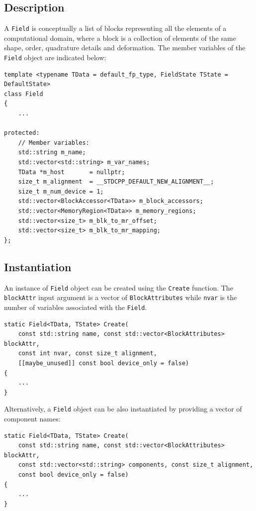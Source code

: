 \subsection{Description}
A \lstinline[style=C++Style]!Field! is conceptually a list of blocks
representing all the elements of a computational domain, where a block
is a collection of elements of the same shape, order, quadrature
details and deformation. The member variables of the
\lstinline[style=C++Style]!Field! object are indicated below:
\begin{lstlisting}[style=C++Style]
template <typename TData = default_fp_type, FieldState TState = DefaultState>
class Field
{
    ...

protected:
    // Member variables:
    std::string m_name;
    std::vector<std::string> m_var_names;
    TData *m_host       = nullptr;
    size_t m_alignment  = __STDCPP_DEFAULT_NEW_ALIGNMENT__;
    size_t m_num_device = 1;
    std::vector<BlockAccessor<TData>> m_block_accessors;
    std::vector<MemoryRegion<TData>> m_memory_regions;
    std::vector<size_t> m_blk_to_mr_offset;
    std::vector<size_t> m_blk_to_mr_mapping; 
};
\end{lstlisting}

\subsection{Instantiation}
An instance of \lstinline[style=C++Style]!Field! object can be created using the \lstinline[style=C++Style]!Create! function. The \lstinline[style=C++Style]!blockAttr! input argument is a vector of \lstinline[style=C++Style]!BlockAttributes! while \lstinline[style=C++Style]!nvar! is the number of variables associated with the \lstinline[style=C++Style]!Field!.
\begin{lstlisting}[style=C++Style]
static Field<TData, TState> Create(
    const std::string name, const std::vector<BlockAttributes> blockAttr,
    const int nvar, const size_t alignment,
    [[maybe_unused]] const bool device_only = false)
{
    ...
}
\end{lstlisting}

Alternatively, a \lstinline[style=C++Style]!Field! object can be also instantiated by providing a vector of component names:
\begin{lstlisting}[style=C++Style]
static Field<TData, TState> Create(
    const std::string name, const std::vector<BlockAttributes> blockAttr,
    const std::vector<std::string> components, const size_t alignment,
    const bool device_only = false)
{
    ...
}
\end{lstlisting}

